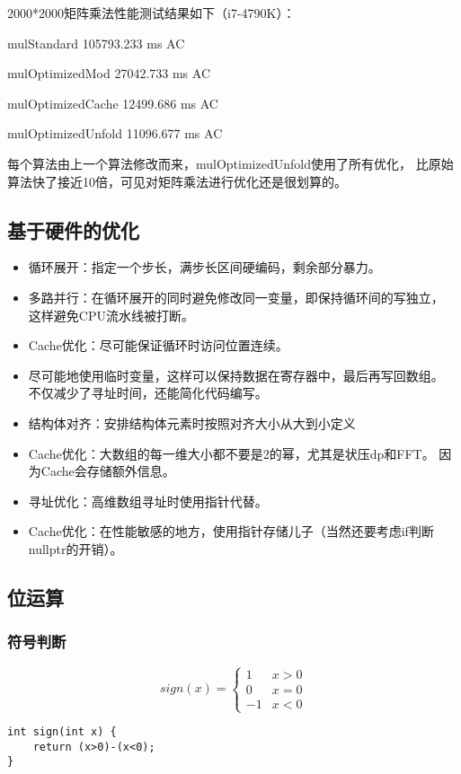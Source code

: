 2000*2000矩阵乘法性能测试结果如下（i7-4790K）：

mulStandard 105793.233 ms AC

mulOptimizedMod 27042.733 ms AC

mulOptimizedCache 12499.686 ms AC

mulOptimizedUnfold 11096.677 ms AC

每个算法由上一个算法修改而来，mulOptimizedUnfold使用了所有优化，
比原始算法快了接近10倍，可见对矩阵乘法进行优化还是很划算的。
\subsection{基于硬件的优化}
\begin{itemize}
    \item 循环展开：指定一个步长，满步长区间硬编码，剩余部分暴力。
    \item 多路并行：在循环展开的同时避免修改同一变量，即保持循环间的写独立，
    这样避免CPU流水线被打断。
    \item Cache优化：尽可能保证循环时访问位置连续。
    \item 尽可能地使用临时变量，这样可以保持数据在寄存器中，最后再写回数组。
    不仅减少了寻址时间，还能简化代码编写。
    \item 结构体对齐：安排结构体元素时按照对齐大小从大到小定义
    \item Cache优化：大数组的每一维大小都不要是2的幂，尤其是状压dp和FFT。
    因为Cache会存储额外信息。
    \item 寻址优化：高维数组寻址时使用指针代替。
    \item Cache优化：在性能敏感的地方，使用指针存储儿子（当然还要考虑if判断
    nullptr的开销）。
\end{itemize}
\subsection{位运算}\label{Bitwise}
\subsubsection{符号判断}
\begin{displaymath}
    sign(x)=\left\{\begin{array}{cc}
        1&x>0\\
        0&x=0\\
        -1&x<0
    \end{array}\right.
\end{displaymath}
\begin{lstlisting}
int sign(int x) {
    return (x>0)-(x<0);
}
\end{lstlisting}

